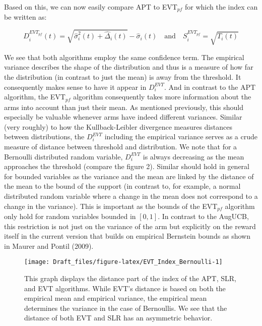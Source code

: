 \documentclass[11pt,]{article}
\begin{document}
Based on this, we can now easily compare APT to EVT\(_{pf}\) for which
the index can be written as:

\[
D_i^{EVT_{pf}}(t) = \sqrt{\hat{\sigma}^2_{i}(t) + \hat{\Delta}_i(t)} - \hat{\sigma}_i(t) \quad \text{and} \quad S_i^{EVT_{pf}} = \sqrt{T_i(t)}
\]

We see that both algorithms employ the same confidence term. The
empirical variance describes the shape of the distribution and thus is a
measure of how far the distribution (in contrast to just the mean) is
away from the threshold. It consequently makes sense to have it appear
in \(D_i^{EVT}\). And in contrast to the APT algorithm, the EVT\(_{pf}\)
algorithm consequently takes more information about the arms into
account than just their mean. As mentioned previously, this should
especially be valuable whenever arms have indeed different variances.
Similar (very roughly) to how the Kullback-Leibler divergence measures
distances between distributions, the \(D_i^{EVT}\) including the
empirical variance serves as a crude measure of distance between
threshold and distribution. We note that for a Bernoulli distributed
random variable, \(D_i^{EVT}\) is always decreasing as the mean
approaches the threshold (compare the figure 2). Similar should hold in
general for bounded variables as the variance and the mean are linked by
the distance of the mean to the bound of the support (in contrast to,
for example, a normal distributed random variable where a change in the
mean does not correspond to a change in the variance). This is important
as the bounds of the EVT\(_{pf}\) algorithm only hold for random
variables bounded in \([0,1]\). In contrast to the AugUCB, this
restriction is not just on the variance of the arm but explicitly on the
reward itself in the current version that builds on empirical Bernstein
bounds as shown in Maurer and Pontil (2009).

\begin{figure}

{\centering \texttt{[image: Draft\_files/figure-latex/EVT\_Index\_Bernoulli-1]} 

}

\caption{This graph displays the distance part of the index of the APT, SLR, and EVT algorithms. While EVT's distance is based on both the empirical mean and empirical variance, the empirical mean determines the variance in the case of Bernoullis. We see that the distance of both EVT and SLR has an asymmetric behavior.}\label{fig:EVT_Index_Bernoulli}
\end{figure}
\end{document}
